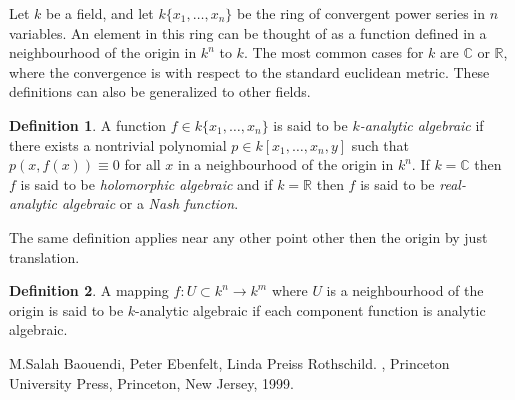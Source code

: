 \documentclass[12pt]{article}
\theoremstyle{theorem}
\theoremstyle{definition}
\newtheorem*{defn}{Definition}
\theoremstyle{remark}
\begin{document}
Let $k$ be a field, and let $k\{x_1,\ldots,x_n\}$ be the ring of convergent
power series in $n$ variables.  An element in this ring can be thought of as
a function defined in a neighbourhood of the origin in $k^n$ to $k$.  The most common cases for $k$ are $\mathbb{C}$ or $\mathbb{R}$, where the convergence is with respect to the standard euclidean metric.  These definitions can also be generalized to other fields.

\begin{defn}
A function $f \in k\{x_1,\ldots,x_n\}$ is said to be \emph{$k$-analytic
algebraic} if there exists a nontrivial polynomial $p \in
k[x_1,\ldots,x_n,y]$ such that $p(x,f(x)) \equiv 0$ for all $x$ in a
neighbourhood of the origin in $k^n$.
If $k=\mathbb{C}$ then $f$ is said to be \emph{holomorphic algebraic} and if
$k=\mathbb{R}$ then $f$ is said to be \emph{real-analytic algebraic} or a
\emph{Nash function}.
\end{defn}

The same definition applies near any other point other then the origin by just translation.

\begin{defn}
A mapping $f \colon U \subset k^n \to k^m$ where $U$ is a neighbourhood of the origin is said to be $k$-analytic algebraic if each component function is analytic algebraic.
\end{defn}

\begin{thebibliography}{9}
M.\@ Salah Baouendi,
Peter Ebenfelt,
Linda Preiss Rothschild.
{\em {}},
Princeton University Press,
Princeton, New Jersey, 1999.
\end{thebibliography}
\end{document}
